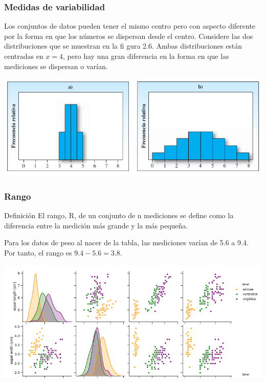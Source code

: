 \documentclass[spanish]{beamer}
\begin{document}
\begin{frame}
\frametitle{Medidas de variabilidad}
Los conjuntos de datos pueden tener el mismo centro pero con aspecto diferente por la forma en que los números se dispersan desde el centro. Considere las dos distribuciones que se muestran en la fi gura 2.6. Ambas distribuciones están centradas en $x=4$, pero hay una gran diferencia en la forma en que las mediciones se dispersan o varían.
\begin{center}
\includegraphics[width=\textwidth]{im11}
\end{center}
\end{frame}

\begin{frame}
\frametitle{Rango}
\begin{block}{Definición}
El rango, R, de un conjunto de n mediciones se define como la diferencia entre la medición más grande y la más pequeña.
\end{block}
\vspace{1em}

Para los datos de peso al nacer de la tabla, las mediciones varían de 5.6 a 9.4. Por tanto, el rango es $9.4-5.6 =3.8$.
\begin{center}
\includegraphics[scale=0.5]{im4}
\end{center}
\end{frame}
\end{document}

